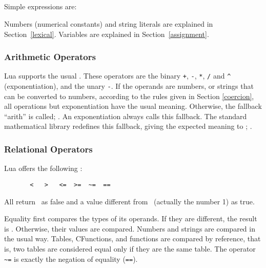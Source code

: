 \subsection{}

\subsubsection{}
Simple expressions are:
\begin{Produc}
\end{Produc}%
Numbers (numerical constants) and
string literals are explained in Section~\ref{lexical}.
Variables are explained in Section~\ref{assignment}.

\subsubsection{Arithmetic Operators}
Lua supports the usual .
These operators are the binary
\verb'+', \verb'-', \verb'*', \verb'/' and \verb'^' (exponentiation),
and the unary \verb'-'.
If the operands are numbers, or strings that can be converted to
numbers, according to the rules given in Section \ref{coercion},
all operations but exponentiation have the usual meaning.
Otherwise, the fallback ``arith'' is called; .
An exponentiation always calls this fallback.
The standard mathematical library redefines this fallback,
giving the expected meaning to ;
.

\subsubsection{Relational Operators}
Lua offers  the following :
\begin{verbatim}
       <   >   <=  >=  ~=  ==
\end{verbatim}
All return \nil\ as false and a value different from \nil\
(actually the number 1) as true.

Equality first compares the types of its operands.
If they are different, the result is \nil.
Otherwise, their values are compared.
Numbers and strings are compared in the usual way.
Tables, CFunctions, and functions are compared by reference,
that is, two tables are considered equal only if they are the same table.
The operator \verb'~=' is exactly the negation of equality (\verb'==').

